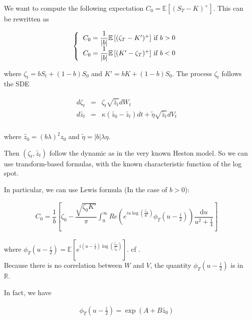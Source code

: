 \documentclass[12pt,a4paper]{article}
\def\E{{\mathbb E}}
\def\R{{\mathbb R}}
\begin{document}
We want to compute the following expectation $C_0= \E \left[ \left( S_T - K\right)^+  \right] $. This can be rewritten as 

\begin{equation*}
\left\{
\begin{tabular}{l}
    $C_0 = \dfrac{1}{|b|}\E \left[ (\zeta_T - K')^+\right]$ if $b > 0$\\
    $C_0 = \dfrac{1}{|b|}\E \left[ (K'-\zeta_T)^+\right]$ if $b < 0$
\end{tabular}
\right.
\end{equation*}

where $\zeta_t = bS_t + (1-b)S_0$ and $K'=bK + (1-b)S_0$. The process $\zeta_t$ follows the SDE

\begin{eqnarray*}
\label{simple}
\begin{array}{rll}
  d \zeta_t &=&  \zeta_t \sqrt{\tilde{z_t}} dW_t\\
  d \tilde{z_t} &=& \kappa (\tilde{z_0} - \tilde{z_t}) dt + \tilde{\eta} \sqrt{\tilde{z_t}} d V_t \\
   \end{array}
\end{eqnarray*}

where $\tilde{z_0}= (b \lambda)^2 z_0 $ and $\tilde{\eta}= |b| \lambda \eta $. 

Then $(\zeta_t,  \tilde{z_t})$ follow the dynamic as in the very known Heston model. So we can use transform-based formulas, with the known characteristic function of the log spot.

In particular, we can use Lewis formula (In the case of $b>0$):

\begin{eqnarray}
\label{cf_heston}
C_0 = \dfrac{1}{b} \left[ \zeta_0 - \dfrac{\sqrt{\zeta_0 K'}}{\pi} \int_{0}^\infty Re \left(e^{i u \log(\frac{\zeta_0}{K'})} \phi_T(u-\frac{i}{2}) \right)\dfrac{\mathrm du}{u^2 +\frac{1}{4}}
\right] 
\end{eqnarray}

where $\phi_T(u-\frac{i}{2}) = \E\left[  e^{i (u-\frac{i}{2}) \log(\frac{\zeta_T}{\zeta_0})}\right] $. cf \cite{Lewis04}.\\

Because there is no correlation between $W$ and $V$, the quantity $\phi_T(u-\frac{i}{2})$ is in $\R$.

In fact, we have

\begin{eqnarray*}
\phi_T(u-\frac{i}{2}) = \exp(A + B \tilde{z_0})
\end{eqnarray*}
\end{document}
